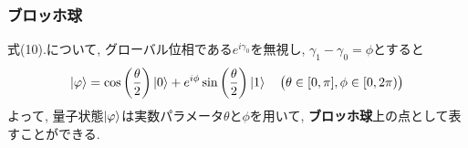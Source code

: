 \documentclass[9pt]{beamer}
\begin{document}
\begin{frame}
  \frametitle{ブロッホ球}
  式(10).について, グローバル位相である$e^{i \gamma_0}$を無視し, $\gamma_1 - \gamma_0 = \phi$とすると
  \begin{align}
    \ket{\varphi} = \cos \left( \frac{\theta}{2} \right) \ket{0} + e^{i \phi} \sin \left( \frac{\theta}{2} \right) \ket{1} \quad \big( \theta \in [0, \pi], \phi \in [0, 2\pi) \big)
  \end{align}
  よって, 量子状態$\ket{\varphi}$は実数パラメータ$\theta$と$\phi$を用いて, \textbf{ブロッホ球}上の点として表すことができる.
  \begin{center}
  
  \end{center}
\end{frame}
\end{document}
